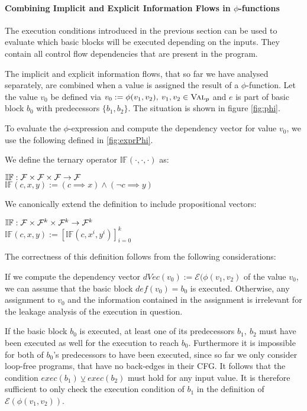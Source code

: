 \paragraph{Combining Implicit and Explicit Information Flows in $\phi$-functions}
The execution conditions introduced in the previous section can be used to evaluate which basic blocks will be executed depending on the inputs. They contain all control flow dependencies that are present in the program.

The implicit and explicit information flows, that so far we have analysed separately, are combined when a value is assigned the result of a $\phi$-function. Let the value $v_0$ be defined via $v_0 := \phi(v_1, v_2), \: v_1, v_2 \in \textsc{Val}_p$ and $e$ is part of basic block $b_0$ with predecessors $\{b_1, b_2\}$. The situation is shown in figure \ref{fig:phi}.

To evaluate the $\phi$-expression and compute the dependency vector for value $v_0$, we use the following defined in \ref{fig:exprPhi}.

\begin{definition}
    We define the ternary operator $\mathbb{IF}(\cdot, \cdot, \cdot)$ as:
    \begin{center}
        $\mathbb{IF}: \mathcal{F} \times \mathcal{F} \times \mathcal{F} \to \mathcal{F}$\\
        $\mathbb{IF}(c, x, y) := (c \implies x) \land (\lnot c \implies y)$
    \end{center}
    We canonically extend the definition to include propositional vectors:
    \begin{center}
        $\mathbb{IF}: \mathcal{F} \times \mathcal{F}^k \times \mathcal{F}^k \to \mathcal{F}^k$\\
        $\mathbb{IF}(c, x, y) := [\mathbb{IF}(c, x^i, y^i)]_{i = 0}^k$
    \end{center}
\end{definition}

The correctness of this definition follows from the following considerations:

If we compute the dependency vector $dVec(v_0) := \mathcal{E}(\phi(v_1, v_2)$ of the value $v_0$, we can assume that the basic block $def(v_0) = b_0$ is executed. Otherwise, any assignment to $v_0$ and the information contained in the assignment is irrelevant for the leakage analysis of the execution in question.

If the basic block $b_0$ is executed, at least one of its predecessors $b_1, \: b_2$ must have been executed as well for the execution to reach $b_0$. Furthermore it is impossible for both of $b_0$'s predecessors to have been executed, since so far we only consider loop-free programs, that have no back-edges in their CFG. It follows that the condition $exec(b_1) \veebar exec(b_2)$ must hold for any input value. It is therefore sufficient to only check the execution condition of $b_1$ in the definition of $\mathcal{E}(\phi(v_1, v_2))$.

